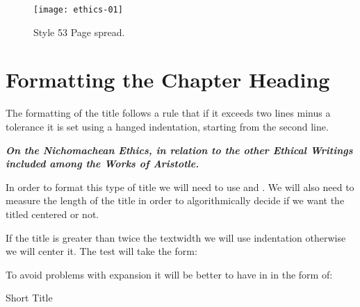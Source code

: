 \begin{figure}[ht]
\texttt{[image: ethics-01]}
\caption{Style 53 Page spread.}
\end{figure}

\section{Formatting the Chapter Heading}

The formatting of the title follows a rule that if it exceeds two lines minus a tolerance it is set using a hanged indentation, starting from the second line. 

\begin{texexample}{}{}
{\parskip0pt
\Large \bfseries \itshape{}
 
On the Nichomachean Ethics, in relation to the other Ethical Writings included among the Works of Aristotle.
\par
}
\end{texexample}

In order to format this type of title we will need to use \cmd{\hangindent} and \cmd{\hangafter}. We will also need to measure the length of the title in order to algorithmically decide if we want the titled centered or not. 

\newsavebox{\testbox}
\savebox{}

If the title is greater than twice the textwidth we will use indentation otherwise we will center it. The test will take
the form:

\begin{texexample}{}{}
\ifdim\wd\testbox>\textwidth true \else false\fi
\end{texexample}

To avoid problems with expansion it will be better to have in in the form of:
       
\begin{texexample}{}{}
\makeatletter
\def\@hangthetitle#1{%
\parskip0pt
\hbox to \columnwidth{\hss\vbox{{%
        \centerline{\texttt{[image: ornamental-rule]}}%
        \titlemargintop@cx
        \Large \bfseries \itshape\language-1
         \hangindent1.5cm \hangafter1
         #1
          \par
       \titlemarginbottom@cx
       }}\hss}%
}
\def\@centerthetitle#1{\Large\bfseries\itshape\centering#1\par}

\def\hangorcenter#1{%
   \savebox\testbox{{\parskip0pt
   \Large \bfseries \itshape\language-1
   #1
   \par
}}

\ifdim\wd\testbox>\textwidth
   \expandafter\@hangthetitle
\else 
   \@centerthetitle
\fi{#1}}

\hangorcenter{\lorem }

\hangorcenter{Short Title}
\makeatother
\end{texexample}

